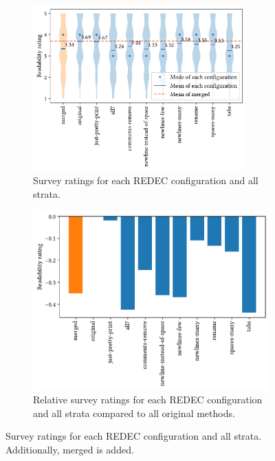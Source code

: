 \documentclass[%
class=scrreprt,
chapterprefix=false,%
open=right,%
twoside=true,%
paper=a4,%
logofile={Logo\_zentral\_farbig\_EN.png},%
thesistype=master,%
UKenglish,%
]{se2thesis}
\theoremstyle{definition}
\newcommand{\rdh}{REDEC\xspace}
\begin{document}
	\begin{figure}[p]
		\centering
		\begin{subfigure}{\linewidth}
			\includegraphics[width=0.9\textwidth]{img/survey_ratings_violin_all.pdf}
			\caption{Survey ratings for each \rdh configuration and all strata.}
			\label{fig:survey_ratings_violin_all}
		\end{subfigure}
		\hfill
		\begin{subfigure}{\textwidth}
			\includegraphics[width=0.9\linewidth]{img/survey_ratings_bar_all.pdf}
			\caption{Relative survey ratings for each \rdh configuration and all strata compared to all original methods.}
			\label{fig:survey_ratings_bar_all}
		\end{subfigure}
		\caption{Survey ratings for each \rdh configuration and all strata. Additionally, merged is added.}
		\label{fig:survey_time_all}
	\end{figure}
	
\end{document}
